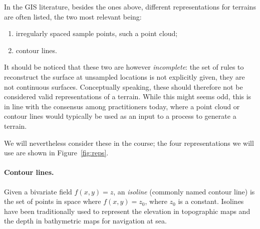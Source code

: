 In the GIS literature, besides the ones above, different representations for terrains are often listed, the two most relevant being:
\begin{enumerate}
  \item irregularly spaced sample points, such a point cloud; 
  \item contour lines.
\end{enumerate}
It should be noticed that these two are however \emph{incomplete}: the set of rules to reconstruct the surface at unsampled locations is not explicitly given, they are not continuous surfaces.
Conceptually speaking, these should therefore not be considered valid representations of a terrain.
While this might seems odd, this is in line with the consensus among practitioners today, where a point cloud or contour lines would typically be used as an input to a process to generate a terrain.

We will nevertheless consider these in the course; the four representations we will use are shown in Figure~\ref{fig:reps}.

%

\paragraph{Contour lines.}%

Given a bivariate field $f(x,y) = z$, an \emph{isoline} (commonly named contour line) is the set of points in space where $f(x,y) = z_0$, where $z_0$ is a constant. 
Isolines have been traditionally used to represent the elevation in topographic maps and the depth in bathymetric maps for navigation at sea. 

%

